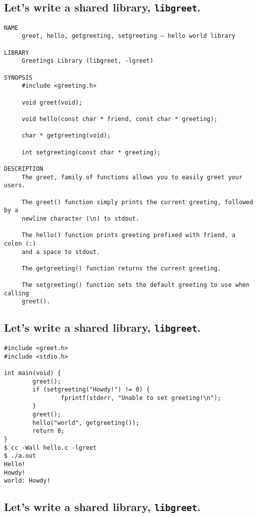 \documentclass[xga]{xdvislides}
\begin{document}
\subsection{Let's write a shared library, {\tt libgreet}.}
\small
\begin{verbatim}
NAME
     greet, hello, getgreeting, setgreeting — hello world library

LIBRARY
     Greetings Library (libgreet, ‐lgreet)

SYNOPSIS
     #include <greeting.h>

     void greet(void);

     void hello(const char * friend, const char * greeting);

     char * getgreeting(void);

     int setgreeting(const char * greeting);

DESCRIPTION
     The greet, family of functions allows you to easily greet your users.

     The greet() function simply prints the current greeting, followed by a
     newline character (\n) to stdout.

     The hello() function prints greeting prefixed with friend, a colon (:)
     and a space to stdout.

     The getgreeting() function returns the current greeting.

     The setgreeting() function sets the default greeting to use when calling
     greet().
\end{verbatim}
\Normalsize

\subsection{Let's write a shared library, {\tt libgreet}.}
\begin{verbatim}
#include <greet.h>
#include <stdio.h>

int main(void) {
        greet();
        if (setgreeting("Howdy!") != 0) {
                fprintf(stderr, "Unable to set greeting!\n");
        }
        greet();
        hello("world", getgreeting());
        return 0;
}
$ cc -Wall hello.c -lgreet
$ ./a.out
Hello!
Howdy!
world: Howdy!
\end{verbatim}
\Normalsize

\subsection{Let's write a shared library, {\tt libgreet}.}
\end{document}
